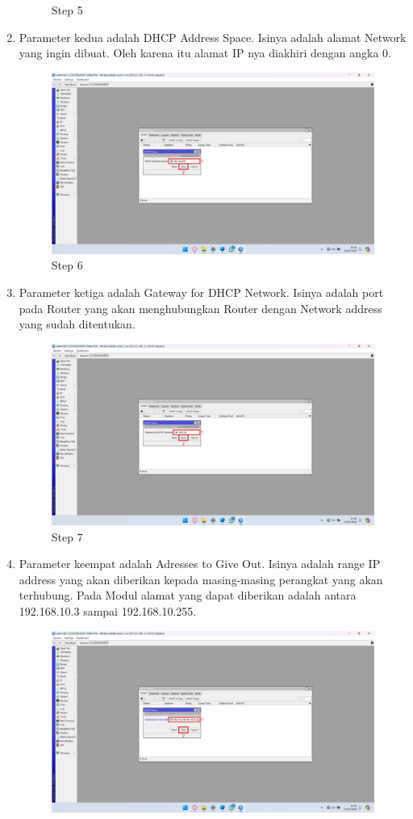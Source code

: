 \begin{center}
\begin{enumerate}
\begin{figure}[H]
			\caption{Step 5}
			\label{fig:Step 5}
		\end{figure}
        \item Parameter kedua adalah DHCP Address Space. Isinya adalah alamat Network yang ingin dibuat. Oleh karena itu alamat IP nya diakhiri dengan angka 0.
        \begin{figure}[H]
			\centering
			\includegraphics[width=0.8\linewidth]{P3/img/Step 6.png}
			\caption{Step 6}
			\label{fig:Step 6}
		\end{figure}
        \item Parameter ketiga adalah Gateway for DHCP Network. Isinya adalah port pada Router yang akan menghubungkan Router dengan Network address yang sudah ditentukan.
        \begin{figure}[H]
			\centering
			\includegraphics[width=0.8\linewidth]{P3/img/Step 7.png}
			\caption{Step 7}
			\label{fig:Step 7}
		\end{figure}
        \item Parameter keempat adalah Adresses to Give Out. Isinya adalah range IP address yang akan diberikan kepada masing-masing perangkat yang akan terhubung. Pada Modul alamat yang dapat diberikan adalah antara 192.168.10.3 sampai 192.168.10.255.
        \begin{figure}[H]
			\centering
			\includegraphics[width=0.8\linewidth]{P3/img/Step 8.png}

\end{figure}
\end{enumerate}
\end{center}
